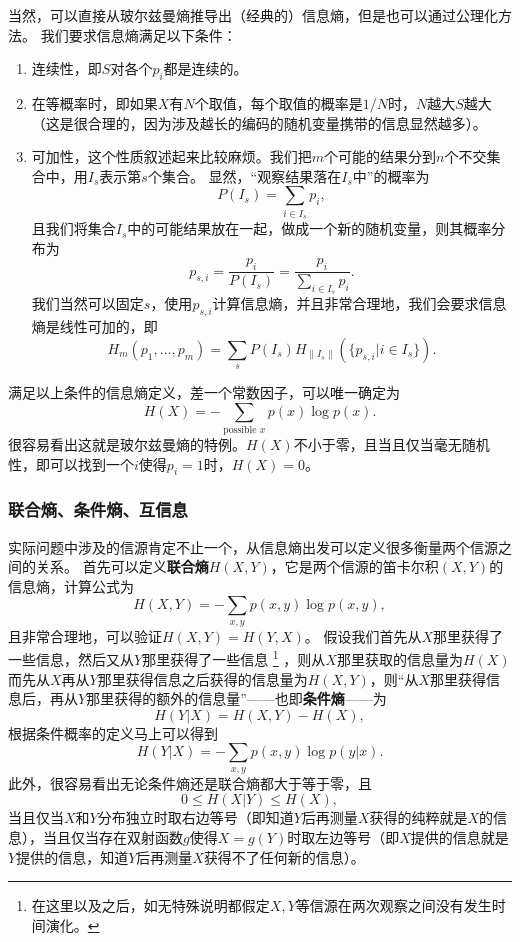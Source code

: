 \documentclass[UTF8, a4paper]{ctexart}
\begin{document}
当然，可以直接从玻尔兹曼熵推导出（经典的）信息熵，但是也可以通过公理化方法。
我们要求信息熵满足以下条件：
\begin{enumerate}
    \item 连续性，即$S$对各个$p_i$都是连续的。
    \item 在等概率时，即如果$X$有$N$个取值，每个取值的概率是$1/N$时，$N$越大$S$越大（这是很合理的，因为涉及越长的编码的随机变量携带的信息显然越多）。
    \item 可加性，这个性质叙述起来比较麻烦。我们把$m$个可能的结果分到$n$个不交集合中，用$I_s$表示第$s$个集合。
    显然，“观察结果落在$I_s$中”的概率为
    \[
        P(I_s) = \sum_{i \in I_s} p_i,
    \]
    且我们将集合$I_s$中的可能结果放在一起，做成一个新的随机变量，则其概率分布为
    \[
        p_{s, i} = \frac{p_i}{P(I_s)} = \frac{p_i}{\sum_{i \in I_s} p_i}.
    \]
    我们当然可以固定$s$，使用$p_{s, i}$计算信息熵，并且非常合理地，我们会要求信息熵是线性可加的，即
    \begin{equation}
        H_m(p_1, \ldots, p_m) = \sum_s P(I_s) H_{\left\| I_s \right\|} (\{p_{s, i} | i \in I_s \}).
    \end{equation}
\end{enumerate}
满足以上条件的信息熵定义，差一个常数因子，可以唯一确定为
\begin{equation}
    H(X) = - \sum_{\text{possible } x} p(x) \log p(x).
\end{equation}
很容易看出这就是玻尔兹曼熵的特例。$H(X)$不小于零，且当且仅当毫无随机性，即可以找到一个$i$使得$p_i=1$时，$H(X)=0$。

\subsubsection{联合熵、条件熵、互信息}

实际问题中涉及的信源肯定不止一个，从信息熵出发可以定义很多衡量两个信源之间的关系。
首先可以定义\textbf{联合熵}$H(X, Y)$，它是两个信源的笛卡尔积$(X, Y)$的信息熵，计算公式为
\begin{equation}
    H(X, Y) = - \sum_{x, y} p(x, y) \log p(x, y),
\end{equation}
且非常合理地，可以验证$H(X, Y) = H(Y, X)$。
假设我们首先从$X$那里获得了一些信息，然后又从$Y$那里获得了一些信息%
\footnote{在这里以及之后，如无特殊说明都假定$X, Y$等信源在两次观察之间没有发生时间演化。}%
，则从$X$那里获取的信息量为$H(X)$而先从$X$再从$Y$那里获得信息之后获得的信息量为$H(X, Y)$，则“从$X$那里获得信息后，再从$Y$那里获得的额外的信息量”——也即\textbf{条件熵}——为
\begin{equation}
    H(Y|X) = H(X, Y) - H(X),
\end{equation}
根据条件概率的定义马上可以得到
\begin{equation}
    H(Y|X) = - \sum_{x, y} p(x, y) \log p(y|x).
\end{equation}
此外，很容易看出无论条件熵还是联合熵都大于等于零，且
\begin{equation}
    0 \leq H(X|Y) \leq H(X),
\end{equation}
当且仅当$X$和$Y$分布独立时取右边等号（即知道$Y$后再测量$X$获得的纯粹就是$X$的信息），当且仅当存在双射函数$g$使得$X=g(Y)$时取左边等号（即$X$提供的信息就是$Y$提供的信息，知道$Y$后再测量$X$获得不了任何新的信息）。
\end{document}
